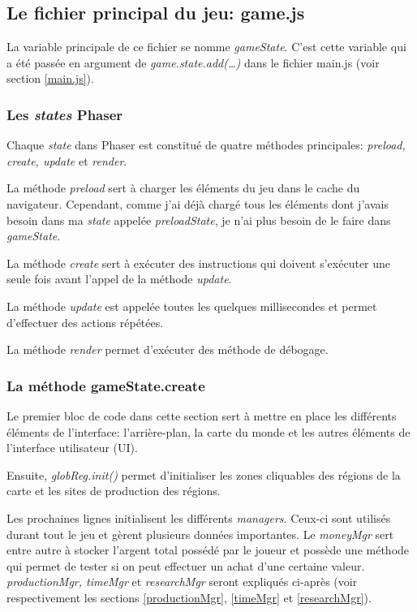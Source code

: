 \documentclass{article}
\begin{document}
		\subsection{Le fichier principal du jeu: game.js}
		
		La variable principale de ce fichier se nomme \textit{gameState}. C'est cette variable qui a été passée en argument de \textit{game.state.add(\dots)} dans le fichier main.js (voir section \ref{main.js}).
		
		\subsubsection{Les \textit{states} Phaser}
		Chaque \textit{state} dans Phaser est constitué de quatre méthodes principales: \textit{preload, create, update} et \textit{render}. 
		
		
		La méthode \textit{preload} sert à charger les éléments du jeu dans le cache du navigateur. Cependant, comme j'ai déjà chargé tous les éléments dont j'avais besoin dans ma \textit{state} appelée \textit{preloadState}, je n'ai plus besoin de le faire dans \textit{gameState}.  
		
		
		La méthode \textit{create} sert à exécuter des instructions qui doivent s'exécuter une seule fois avant l'appel de la méthode \textit{update}.
		
		
		La méthode \textit{update} est appelée toutes les quelques millisecondes et permet d'effectuer des actions répétées.
		
		
		La méthode \textit{render} permet d'exécuter des méthode de débogage.
		
		\subsubsection{La méthode gameState.create}
		Le premier bloc de code dans cette section sert à mettre en place les différents éléments de l'interface: l'arrière-plan, la carte du monde et les autres éléments de l'interface utilisateur (UI).
		
		
		Ensuite, \textit{globReg.init()} permet d'initialiser les zones cliquables des régions de la carte et les sites de production des régions.
		
		
		Les prochaines lignes initialisent les différents \textit{managers}. Ceux-ci sont utilisés durant tout le jeu et gèrent plusieurs données importantes. Le \textit{moneyMgr} sert entre autre à stocker l'argent total possédé par le joueur et possède une méthode qui permet de tester si on peut effectuer un achat d'une certaine valeur. \textit{productionMgr, timeMgr} et \textit{researchMgr} seront expliqués ci-après (voir respectivement les sections \ref{productionMgr}, \ref{timeMgr} et \ref{researchMgr}).
		
\end{document}
